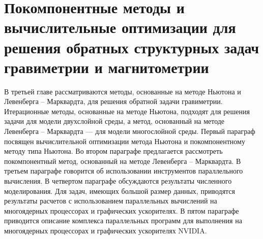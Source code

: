 \chapter{Покомпонентные методы и вычислительные оптимизации для решения обратных структурных задач гравиметрии и магнитометрии}

В третьей главе рассматриваются методы, основанные на методе Ньютона и Левенберга -- Марквардта, для решения обратной задачи гравиметрии. Итерационные методы, основанные на методе Ньютона, подходят для решения задачи для модели двухслойной среды, а метод, основанный на методе Левенберга -- Марквардта --- для модели многослойной среды. Первый параграф посвящен вычислительной оптимизации метода Ньютона и покомпонентному методу типа Ньютона. Во втором параграфе предлагается рассмотреть покомпонентный метод, основанный на методе Левенберга -- Марквардта. В третьем параграфе говорится об использовании инструментов параллельного вычисления. В четвертом параграфе обсуждаются результаты численного моделирования. Для задач, имеющих большой размер данных, приводятся результаты расчетов с использованием параллельных вычислений на многоядерных процессорах и графических ускорителях. В пятом параграфе приводится описание комплекса параллельных программ для выполнения на многоядерных процессорах и графических ускорителях NVIDIA.

